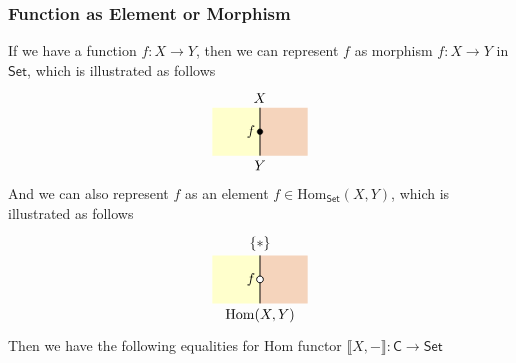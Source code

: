\subsubsection{Function as Element or Morphism}
If we have a function $f:X\to Y$, then we can represent $f$ as morphism $f:X\to Y$ in $\mathsf{Set}$, which is illustrated as follows
\[
    \begin{tikzpicture}[x=0.6cm,y=0.6cm, baseline=(current bounding box.center)]
        \definecolor{leftcolor}{RGB}{255,255,204} %
        \definecolor{rightcolor}{HTML}{F5D4BC}  %
    
        \fill[leftcolor] (0,0) rectangle (2,2);
        \fill[rightcolor] (2,0) rectangle (4,2);
    
        \draw[line width=0.7pt] (2,0) -- (2,2);
        \filldraw [black] (2,1) circle (2pt) node[anchor=east] {$f$};
    
        \draw (2,0) node[below] {$Y$};
        \draw (2,2) node[above] {$X$};
    \end{tikzpicture}
\]
And we can also represent $f$ as an element $f\in \mathrm{Hom}_{\mathsf{Set}}(X,Y)$, which is illustrated as follows
\[
    \begin{tikzpicture}[
        x=0.6cm,
        y=0.6cm,
        mydot/.style={
            circle,
            fill=white,
            draw,
            outer sep=0pt,
            inner sep=1.7pt,
            line width=0.7pt
          }]
        \definecolor{leftcolor}{RGB}{255,255,204} %
        \definecolor{rightcolor}{HTML}{F5D4BC}  %
    
        \fill[leftcolor] (0,0) rectangle (2,2);
        \fill[rightcolor] (2,0) rectangle (4,2);
    
        \draw[line width=0.7pt] (2,0) -- (2,2);
        \draw (2,1) node[mydot] {};
        \draw (2,1) node[left] {$f$};
    
        \draw (2,0) node[below] {$\mathrm{Hom}(X,Y)$};
        \draw (2,2) node[above] {$\{*\}$};
    \end{tikzpicture}
\]
Then we have the following equalities for Hom functor $\llbracket X , -\rrbracket:\mathsf{C}\to \mathsf{Set}$
